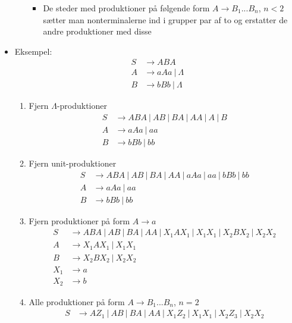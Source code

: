 \documentclass[a4, danish]{article}
\begin{document}
\begin{itemize}
\begin{enumerate}
    \begin{itemize}
    	\item De steder med produktioner på følgende form $A \rightarrow B_1 ... B_n$, $n<2$ sætter man nonterminalerne ind i grupper par af to og erstatter de andre produktioner med disse 
    \end{itemize}
  \end{enumerate}
  \item Eksempel: 
   \begin{align*}
     S &\rightarrow ABA \\
     A &\rightarrow aAa  \ | \ \Lambda \\
     B &\rightarrow bBb  \ | \ \Lambda 
   \end{align*}
 \begin{enumerate}
   \item Fjern $\Lambda$-produktioner
   \begin{align*}
     S &\rightarrow ABA \ | \ AB  \ | \ BA \ | \ AA \ | \ A  \ | \ B \\
     A &\rightarrow aAa  \ | \ aa \\
     B &\rightarrow bBb  \ | \ bb 
   \end{align*}
   \item Fjern unit-produktioner
   \begin{align*}
     S &\rightarrow ABA \ | \ AB  \ | \ BA \ | \ AA \ | \  aAa  \ | \ aa  \ | \ bBb  \ | \ bb \\
     A &\rightarrow aAa  \ | \ aa \\
     B &\rightarrow bBb  \ | \ bb 
   \end{align*}
   \item Fjern produktioner på form $A \rightarrow a$
   \begin{align*}
     S &\rightarrow ABA \ | \ AB  \ | \ BA \ | \ AA \ | \  X_1AX_1  \ | \ X_1X_1  \ | \ X_2BX_2  \ | \ X_2X_2 \\
     A &\rightarrow X_1AX_1  \ | \ X_1X_1 \\
     B &\rightarrow X_2BX_2  \ | \ X_2X_2 \\
     X_1 &\rightarrow a \\
     X_2 &\rightarrow b 
   \end{align*}
   \item Alle produktioner på form $A \rightarrow B_1 ... B_n$, $n=2$
   \begin{align*}
     S &\rightarrow AZ_1 \ | \ AB  \ | \ BA \ | \ AA \ | \  X_1Z_2  \ | \ X_1X_1  \ | \ X_2Z_3  \ | \ X_2X_2 \\

\end{align*}
\end{enumerate}
\end{itemize}
\end{document}
